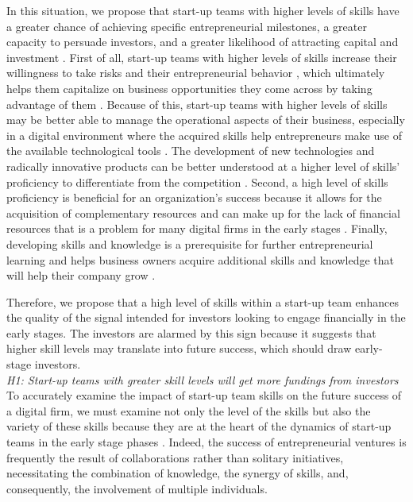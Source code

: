 \documentclass[12pt]{article}
\begin{document}
In this situation, we propose that start-up teams with higher levels of skills have a greater chance of achieving specific entrepreneurial milestones, a greater capacity to persuade investors, and a greater likelihood of attracting capital and investment \citep{zarutskie2010role}. First of all, start-up teams with higher levels of skills increase their willingness to take risks and their entrepreneurial behavior \citep{becherer1999proactive}, which ultimately helps them capitalize on business opportunities they come across by taking advantage of them \citep{shane2000promise, chandler1994founder}. Because of this, start-up teams with higher levels of skills may be better able to manage the operational aspects of their business, especially in a digital environment where the acquired skills help entrepreneurs make use of the available technological tools \citep{nambisan2017digital}. The development of new technologies and radically innovative products can be better understood at a higher level of skills' proficiency to differentiate from the competition \citep{marvel2007technology}. Second, a high level of skills proficiency is beneficial for an organization's success because it allows for the acquisition of complementary resources and can make up for the lack of financial resources that is a problem for many digital firms in the early stages \citep{beckman2007early}. Finally, developing skills and knowledge is a prerequisite for further entrepreneurial learning and helps business owners acquire additional skills and knowledge that will help their company grow \citep{hunter1986cognitive}.

Therefore, we propose that a high level of skills within a start-up team enhances the quality of the signal intended for investors looking to engage financially in the early stages. The investors are alarmed by this sign because it suggests that higher skill levels may translate into future success, which should draw early-stage investors. \\

\noindent \textit{H1: Start-up teams with greater skill levels will get more fundings from investors} \\

To accurately examine the impact of start-up team skills on the future success of a digital firm, we must examine not only the level of the skills but also the variety of these skills because they are at the heart of the dynamics of start-up teams in the early stage phases \citep{grillitsch2021does}. Indeed, the success of entrepreneurial ventures is frequently the result of collaborations rather than solitary initiatives, necessitating the combination of knowledge, the synergy of skills, and, consequently, the involvement of multiple individuals.
\end{document}
